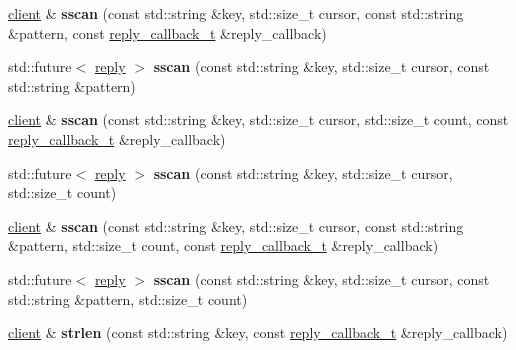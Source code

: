 \begin{DoxyCompactItemize}
\hyperlink{classcpp__redis_1_1client}{client} \& {\bfseries sscan} (const std\+::string \&key, std\+::size\+\_\+t cursor, const std\+::string \&pattern, const \hyperlink{classcpp__redis_1_1client_a061a1140d36d2eaeda82b09a0bb3f9f2}{reply\+\_\+callback\+\_\+t} \&reply\+\_\+callback)
\item 
\mbox{\label{classcpp__redis_1_1client_a3ebaa0831cd98cf76ff857e372672927}} 
std\+::future$<$ \hyperlink{classcpp__redis_1_1reply}{reply} $>$ {\bfseries sscan} (const std\+::string \&key, std\+::size\+\_\+t cursor, const std\+::string \&pattern)
\item 
\mbox{\label{classcpp__redis_1_1client_a9bffecb9c655eb2820bde4f3ea1eaa34}} 
\hyperlink{classcpp__redis_1_1client}{client} \& {\bfseries sscan} (const std\+::string \&key, std\+::size\+\_\+t cursor, std\+::size\+\_\+t count, const \hyperlink{classcpp__redis_1_1client_a061a1140d36d2eaeda82b09a0bb3f9f2}{reply\+\_\+callback\+\_\+t} \&reply\+\_\+callback)
\item 
\mbox{\label{classcpp__redis_1_1client_af675aaaabeb7e4475e33612015030ece}} 
std\+::future$<$ \hyperlink{classcpp__redis_1_1reply}{reply} $>$ {\bfseries sscan} (const std\+::string \&key, std\+::size\+\_\+t cursor, std\+::size\+\_\+t count)
\item 
\mbox{\label{classcpp__redis_1_1client_a45f08a1f6086f2396ac4f01ddeee0485}} 
\hyperlink{classcpp__redis_1_1client}{client} \& {\bfseries sscan} (const std\+::string \&key, std\+::size\+\_\+t cursor, const std\+::string \&pattern, std\+::size\+\_\+t count, const \hyperlink{classcpp__redis_1_1client_a061a1140d36d2eaeda82b09a0bb3f9f2}{reply\+\_\+callback\+\_\+t} \&reply\+\_\+callback)
\item 
\mbox{\label{classcpp__redis_1_1client_adec2116398026c986f041a91ef922ba7}} 
std\+::future$<$ \hyperlink{classcpp__redis_1_1reply}{reply} $>$ {\bfseries sscan} (const std\+::string \&key, std\+::size\+\_\+t cursor, const std\+::string \&pattern, std\+::size\+\_\+t count)
\item 
\mbox{\label{classcpp__redis_1_1client_ab7dab44434cee5e29e2bdf3c3be1df94}} 
\hyperlink{classcpp__redis_1_1client}{client} \& {\bfseries strlen} (const std\+::string \&key, const \hyperlink{classcpp__redis_1_1client_a061a1140d36d2eaeda82b09a0bb3f9f2}{reply\+\_\+callback\+\_\+t} \&reply\+\_\+callback)

\end{DoxyCompactItemize}
